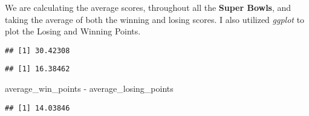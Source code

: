 \documentclass[
]{article}
\newenvironment{Shaded}{\begin{snugshade}}{\end{snugshade}}
\newcommand{\FunctionTok}[1]{\textcolor[rgb]{0.00,0.00,0.00}{#1}}
\newcommand{\NormalTok}[1]{#1}
\newcommand{\OtherTok}[1]{\textcolor[rgb]{0.56,0.35,0.01}{#1}}
\newcommand{\SpecialCharTok}[1]{\textcolor[rgb]{0.00,0.00,0.00}{#1}}
\begin{document}
We are calculating the average scores, throughout all the \textbf{Super
Bowls}, and taking the average of both the winning and losing scores. I
also utilized \emph{ggplot} to plot the Losing and Winning Points.

\begin{Shaded}
\end{Shaded}

\begin{verbatim}
## [1] 30.42308
\end{verbatim}

\begin{Shaded}
\end{Shaded}

\begin{verbatim}
## [1] 16.38462
\end{verbatim}

\begin{Shaded}
\begin{Highlighting}[]
\NormalTok{average\_win\_points }\SpecialCharTok{{-}}\NormalTok{ average\_losing\_points}
\end{Highlighting}
\end{Shaded}

\begin{verbatim}
## [1] 14.03846
\end{verbatim}
\end{document}
